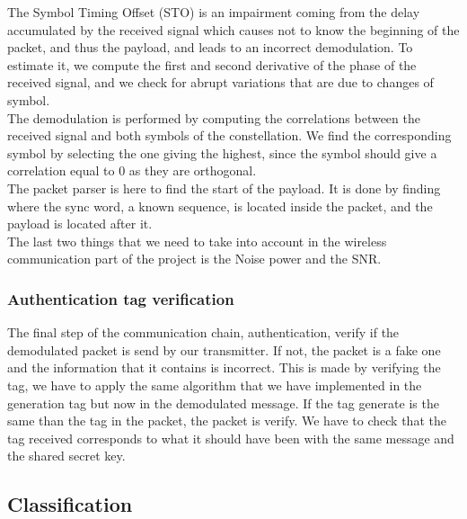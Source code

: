 \documentclass{article}
\begin{document}
The Symbol Timing Offset (STO) is an impairment coming from the delay accumulated by the received signal which causes not to know the beginning of the packet, and thus the payload, and leads to an incorrect demodulation. To estimate it, we compute the first and second derivative of the phase of the received signal, and we check for abrupt variations that are due to changes of symbol. \\
The demodulation is performed by computing the correlations between the received signal and both symbols of the constellation. We find the corresponding symbol by selecting the one giving the highest, since the symbol should give a correlation equal to 0 as they are orthogonal. \\
The packet parser is here to find the start of the payload. It is done by finding where the sync word, a known sequence, is located inside the packet, and the payload is located after it. \\

The last two things that  we need to take into account in the wireless communication part of the project is the Noise power and the SNR. 

\subsubsection{Authentication tag verification}

The final step of the communication chain, authentication, verify if the demodulated packet is send by our transmitter. If not, the packet is a fake one and the information that it contains is incorrect. This is made by verifying the tag, we have to apply the same algorithm that we have implemented in the generation tag but now in the demodulated message. If the tag generate is the same than the tag in the packet, the packet is verify. 
We have to check that the tag received corresponds to what it should have been with the same message and the shared secret key.

\subsection{Classification}
\end{document}
